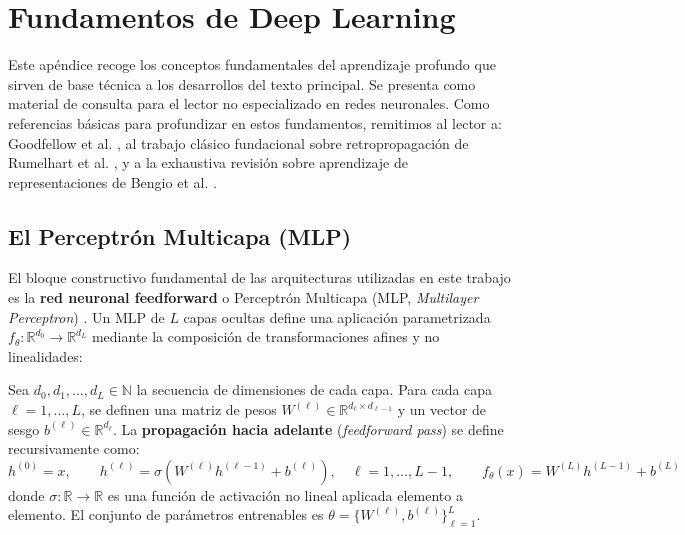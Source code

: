 \chapter{Fundamentos de Deep Learning}
\label{ap:fundamentos_dl}

Este apéndice recoge los conceptos fundamentales del aprendizaje profundo que sirven de base técnica a los desarrollos del texto principal. Se presenta como material de consulta para el lector no especializado en redes neuronales. Como referencias básicas para profundizar en estos fundamentos, remitimos al lector a: Goodfellow et al. \cite{goodfellow2016deep}, al trabajo clásico fundacional sobre retropropagación de Rumelhart et al. \cite{rumelhart1986learning}, y a la exhaustiva revisión sobre aprendizaje de representaciones de Bengio et al. \cite{bengio2013representation}.

\section{El Perceptrón Multicapa (MLP)}
\label{sec:mlp}

El bloque constructivo fundamental de las arquitecturas utilizadas en este trabajo es la \textbf{red neuronal feedforward} o Perceptrón Multicapa (MLP, \textit{Multilayer Perceptron}) \cite{goodfellow2016deep}. Un MLP de $L$ capas ocultas define una aplicación parametrizada $f_\theta: \mathbb{R}^{d_0} \to \mathbb{R}^{d_L}$ mediante la composición de transformaciones afines y no linealidades:

\begin{definition}
Sea $d_0, d_1, \ldots, d_L \in \mathbb{N}$ la secuencia de dimensiones de cada capa. Para cada capa $\ell = 1, \ldots, L$, se definen una matriz de pesos $W^{(\ell)} \in \mathbb{R}^{d_\ell \times d_{\ell-1}}$ y un vector de sesgo $b^{(\ell)} \in \mathbb{R}^{d_\ell}$. La \textbf{propagación hacia adelante} (\textit{feedforward pass}) se define recursivamente como:
\begin{equation}
\label{eq:feedforward}
h^{(0)} = x, \qquad
h^{(\ell)} = \sigma\!\left(W^{(\ell)} h^{(\ell-1)} + b^{(\ell)}\right), \quad \ell = 1, \ldots, L-1, \qquad
f_\theta(x) = W^{(L)} h^{(L-1)} + b^{(L)}
\end{equation}
donde $\sigma: \mathbb{R} \to \mathbb{R}$ es una función de activación no lineal aplicada elemento a elemento. El conjunto de parámetros entrenables es $\theta = \{W^{(\ell)}, b^{(\ell)}\}_{\ell=1}^{L}$.
\end{definition}

